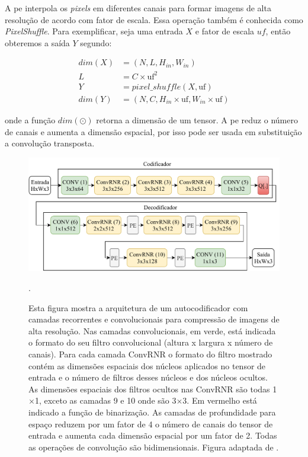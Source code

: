 A \acrshort{pe} interpola os \textit{pixels} em diferentes canais para formar imagens de alta resolução de acordo com fator de escala. Essa operação também é conhecida como \textit{PixelShuffle}. Para exemplificar, seja uma entrada $X$ e fator de escala $uf$, então obteremos a saída $Y$ segundo:   

\begin{equation}
\label{eq:pf}
\begin{aligned}
dim(X) &= (N,L,H_{in}, W_{in}) \\
L &=  C \times \text{uf}^2 \\ 
Y &= \textit{pixel}\_shuffle(X, \text{uf}) \\
dim(Y) &= (N,C,H_{in} \times \text{uf}, W_{in}\times \text{uf}) 
\end{aligned}
\end{equation} 

\noindent onde a função $dim \left( \odot \right)$ retorna a dimensão de um tensor. A \acrshort{pe} reduz o número de canais e aumenta a dimensão espacial, por isso pode ser usada em substituição a convolução transposta.  

\begin{figure}[h]
	\centering
	\includegraphics[width=1.00\textwidth]{figuras/toderici_3.pdf}
	\caption[Arquitetura do autocodificador com camadas Conv2DRNR]{ Esta figura mostra a arquitetura de um autocodificador com camadas recorrentes  e convolucionais para compressão de imagens de alta resolução. Nas camadas convolucionais, em verde, está indicada o formato do seu filtro convolucional (altura x largura x número de canais). Para cada camada ConvRNR o formato do filtro mostrado contém as dimensões  espaciais dos núcleos aplicados no tensor de entrada e o número de filtros desses núcleos e dos núcleos ocultos. As dimensões espaciais dos filtros ocultos nas ConvRNR são todas 1$\times$1, exceto as camadas 9 e 10 onde são 3$\times$3. Em vermelho está indicado a função de binarização.  As camadas de profundidade para espaço reduzem por um fator de 4 o número de canais do tensor de entrada e aumenta cada dimensão espacial por um fator de 2. Todas as operações de convolução são bidimensionais. Figura adaptada de \cite{FullResolution2017Toderici}.}.
	
	\label{fig:toderici3}
\end{figure}

